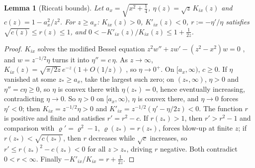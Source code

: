 \documentclass[11pt]{article}
\newtheorem{lemma}[theorem]{Lemma}
\theoremstyle{definition}\newtheorem{definition}[theorem]{Definition}
\theoremstyle{remark}\newtheorem{remark}[theorem]{Remark}
\begin{document}
\begin{lemma}[Riccati bounds]\label{lem:riccati}
Let $a_x=\sqrt{x^2+\frac14}$, $\eta(z)=\sqrt z\,K_{ix}(z)$ and $c(z)=1-a_x^2/z^2$. For $z\ge a_x$: $K_{ix}(z)>0$, $K'_{ix}(z)<0$, $r:=-\eta'/\eta$ satisfies $\sqrt{c(z)}\le r(z)\le1$, and $0<-K'_{ix}(z)/K_{ix}(z)\le1+\frac1{2z}$.
\end{lemma}
\begin{proof}
$K_{ix}$ solves the modified Bessel equation $z^2w''+zw'-(z^2-x^2)w=0$ \cite[\S10.25]{DLMF}, and $w=z^{-1/2}\eta$ turns it into $\eta''=c\,\eta$. As $z\to\infty$, $K_{ix}(z)=\sqrt{\pi/2z}\,e^{-z}(1+O(1/z))$ \cite[\S10.40]{DLMF}, so $\eta\to0^+$. On $[a_x,\infty)$, $c\ge0$. If $\eta$ vanished at some $z_*\ge a_x$, take the largest such zero; on $(z_*,\infty)$, $\eta>0$ and $\eta''=c\eta\ge0$, so $\eta$ is convex there with $\eta(z_*)=0$, hence eventually increasing, contradicting $\eta\to0$. So $\eta>0$ on $[a_x,\infty)$, $\eta$ is convex there, and $\eta\to0$ forces $\eta'<0$; then $K_{ix}=z^{-1/2}\eta>0$ and $K'_{ix}=z^{-1/2}(\eta'-\eta/2z)<0$. The function $r$ is positive and finite and satisfies $r'=r^2-c$. If $r(z_*)>1$, then $r'>r^2-1$ and comparison with $\varrho'=\varrho^2-1$, $\varrho(z_*)=r(z_*)$, forces blow-up at finite $z$; if $r(z_*)<\sqrt{c(z_*)}$, then $r$ decreases while $\sqrt c$ increases, so $r'\le r(z_*)^2-c(z_*)<0$ for all $z>z_*$, driving $r$ negative. Both contradict $0<r<\infty$. Finally $-K'_{ix}/K_{ix}=r+\frac1{2z}$.
\end{proof}
\end{document}
